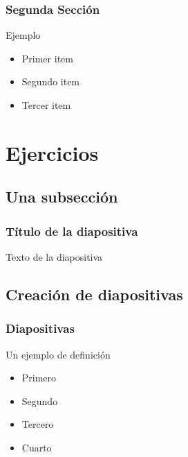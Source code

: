 \documentclass{beamer}
\begin{document}
\begin{frame}

\frametitle{Segunda Sección}

\begin{block}{Ejemplo}
  \begin{itemize}
  \item
  Primer item 
  \pause

  \item
  Segundo item
  \pause

  \item
  Tercer item

  \end{itemize}
\end{block}

\end{frame}

\section{Ejercicios}

\subsection{Una subsección}
\begin{frame}
\frametitle{Título de la diapositiva}

Texto de la diapositiva
\end{frame}

\subsection{Creación de diapositivas}

\begin{frame}
\frametitle{Diapositivas}

\begin{definition}
  Un ejemplo de definición
\end{definition}

\begin{example}
  \begin{itemize}
    \item <1-> Primero \pause
    \item <2-> Segundo \pause
    \item <3-> Tercero \pause
    \item <4-> Cuarto  
  \end{itemize}
\end{example}

\end{frame}
\end{document}

